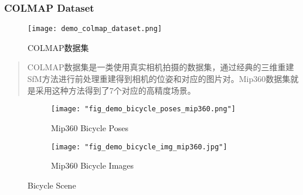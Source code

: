 \begin{frame}
    \frametitle{COLMAP Dataset}
    \begin{figure}[H]
        \texttt{[image: demo\_colmap\_dataset.png]}
        \caption[short]{COLMAP数据集}
    \end{figure}
    \begin{quote}
        COLMAP数据集是一类使用真实相机拍摄的数据集，通过经典的三维重建SfM方法进行前处理重建得到相机的位姿和对应的图片对。Mip360数据集就是采用这种方法得到了7个对应的高精度场景。
    \end{quote}
\end{frame}

\begin{figure}
    \centering
    \begin{subfigure}{0.48\linewidth}
        \texttt{[image: "fig\_demo\_bicycle\_poses\_mip360.png"]}
        \caption{Mip360 Bicycle Poses}
    \end{subfigure}
    \begin{subfigure}{0.48\linewidth}
        \texttt{[image: "fig\_demo\_bicycle\_img\_mip360.jpg"]}
        \caption{Mip360 Bicycle Images}
    \end{subfigure}
    \caption{Bicycle Scene}
    \label{mip360:dataset:bicycle}
\end{figure}
